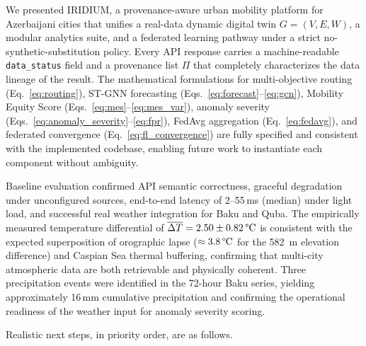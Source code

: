 
We presented IRIDIUM, a provenance-aware urban mobility platform for
Azerbaijani cities that unifies a real-data dynamic digital twin
$G=(V,E,W)$, a modular analytics suite, and a federated learning pathway
under a strict no-synthetic-substitution policy.
Every API response carries a machine-readable \texttt{data\_status} field
and a provenance list $\Pi$ that completely characterizes the data lineage
of the result.
The mathematical formulations for multi-objective routing
(Eq.~\ref{eq:routing}), ST-GNN forecasting
(Eqs.~\ref{eq:forecast}--\ref{eq:gcn}), Mobility Equity Score
(Eqs.~\ref{eq:mes}--\ref{eq:mes_var}), anomaly severity
(Eqs.~\ref{eq:anomaly_severity}--\ref{eq:fpr}),
FedAvg aggregation (Eq.~\ref{eq:fedavg}), and federated convergence
(Eq.~\ref{eq:fl_convergence}) are fully specified and consistent with
the implemented codebase, enabling future work to instantiate each
component without ambiguity.

Baseline evaluation confirmed API semantic correctness, graceful
degradation under unconfigured sources, end-to-end latency of
2--55\,ms (median) under light load, and successful real weather
integration for Baku and Quba.
The empirically measured temperature differential of
$\overline{\Delta T} = 2.50 \pm 0.82\,\text{\textdegree{}C}$ is
consistent with the expected superposition of orographic lapse
($\approx 3.8\,\text{\textdegree{}C}$ for the \SI{582}{m} elevation
difference) and Caspian Sea thermal buffering, confirming that multi-city
atmospheric data are both retrievable and physically coherent.
Three precipitation events were identified in the 72-hour Baku series,
yielding approximately 16\,mm cumulative precipitation and confirming
the operational readiness of the weather input for anomaly severity scoring.

Realistic next steps, in priority order, are as follows.


